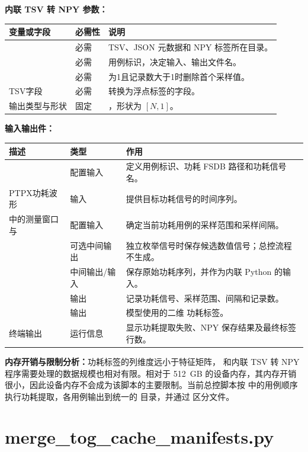 \textbf{内联 TSV 转 NPY 参数：}
\begin{longtable}{L{0.28\textwidth}L{0.14\textwidth}L{0.45\textwidth}}
\toprule 变量或字段 & 必需性 & 说明 \\ \midrule
{} & 必需 & TSV、JSON 元数据和 NPY 标签所在目录。 \\
 & 必需 & 用例标识，决定输入、输出文件名。 \\
 & 必需 & 为1且记录数大于1时删除首个采样值。 \\
TSV字段  & 必需 & 转换为浮点标签的字段。 \\
输出类型与形状 & 固定 & ，形状为 $[N,1]$。 \\
\bottomrule
\end{longtable}

\textbf{输入输出件：}
\begin{longtable}{L{0.33\textwidth}L{0.13\textwidth}L{0.42\textwidth}}
\toprule 描述 & 类型 & 作用 \\ \midrule
{} & 配置输入 & 定义用例标识、功耗 FSDB 路径和功耗信号名。 \\
PTPX功耗波形  & 输入 & 提供目标功耗信号的时间序列。 \\
 中的测量窗口与  & 配置输入 & 确定当前功耗用例的采样范围和采样间隔。 \\
 & 可选中间输出 & 独立枚举信号时保存候选数值信号；总控流程不生成。 \\
 & 中间输出/输入 & 保存原始功耗序列，并作为内联 Python 的输入。 \\
 & 输出 & 记录功耗信号、采样范围、间隔和记录数。 \\
 & 输出 & 模型使用的二维  功耗标签。 \\
终端输出 & 运行信息 & 显示功耗提取失败、NPY 保存结果及最终标签行数。 \\
\bottomrule
\end{longtable}

\textbf{内存开销与限制分析：}功耗标签的列维度远小于特征矩阵， 和内联 TSV 转 NPY 程序需要处理的数据规模也相对有限。相对于 512~GB 的设备内存，其内存开销很小，因此设备内存不会成为该脚本的主要限制。当前总控脚本按  中的用例顺序执行功耗提取，各用例输出到统一的  目录，并通过  区分文件。


\section{merge\_tog\_cache\_manifests.py}

